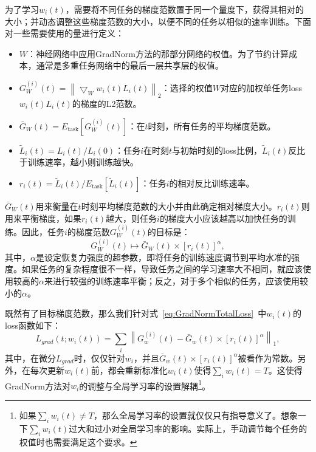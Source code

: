 \documentclass{ctexart}
\begin{document}
为了学习$w_i(t)$，需要将不同任务的梯度范数置于同一个量度下，获得其相对的大小；并动态调整这些梯度范数的大小，以便不同的任务以相似的速率训练。下面对一些需要使用的量进行定义：
\begin{itemize}
    \item $W$：神经网络中应用GradNorm方法的那部分网络的权值。为了节约计算成本，通常是多重任务网络中的最后一层共享层的权值。
    \item $G_{W}^{(i)}(t) =\left \| \bigtriangledown_{W}w_{i}(t)L_{i}(t) \right \|_{2}$：选择的权值$W$对应的加权单任务loss\ $w_{i}(t)L_{i}(t)$的梯度的L2范数。
    \item $\bar{G}_{W}(t)=E_\mathrm{task}[G_{W}^{(i)}(t)]$：在$t$时刻，所有任务的平均梯度范数。
    \item $\tilde{L}_{i}(t)={L_{i}(t)}/{L_{i}(0)}$：任务$i$在时刻$t$与初始时刻的loss比例，$\tilde{L}_{i}(t)$反比于训练速率，越小则训练越快。 %
    \item $r_{i}(t)=\tilde{L}_{i}(t)/E_\mathrm{task}[\tilde{L}_{i}(t)]$：任务$i$的相对反比训练速率。
\end{itemize}

$\bar{G}_{W}(t)$用来衡量在$t$时刻平均梯度范数的大小并由此确定相对梯度大小。$r_{i}(t)$则用来平衡梯度，如果$r_{i}(t)$越大，则任务$i$的梯度大小应该越高以加快任务的训练。因此，任务$i$的梯度范数$G_{W}^{(i)}(t)$的目标是：
\begin{equation}
    G_{W}^{(i)}(t) \mapsto \bar{G}_W(t) \times [r_i(t)]^\alpha, 
\end{equation}
其中，$\alpha$是设定恢复力强度的超参数，即将任务的训练速度调节到平均水准的强度。如果任务的复杂程度很不一样，导致任务之间的学习速率大不相同，就应该使用较高的$\alpha$来进行较强的训练速率平衡；反之，对于多个相似的任务，应该使用较小的$\alpha$。

既然有了目标梯度范数，那么我们针对式~\ref{eq:GradNormTotalLoss}~中$w_i(t)$的loss函数如下：
\begin{equation}
    L_{grad}(t;w_{i}(t))=\sum_{i}\left \| G_{w}^{(i)}(t)-\bar{G}_{w}(t) \times [r_{i}(t)]^{\alpha} \right \|_{1},
\end{equation}
其中，在微分$L_{grad}$时，仅仅针对$w_i$，并且$\bar{G}_{w}(t)\times[r_{i}(t)]^{\alpha}$被看作为常数。另外，在每次更新$w_i(t)$前，都会重新标准化$w_i(t)$使得$\sum_{i}w_{i}(t)=T$。这使得GradNorm方法对$w_i$的调整与全局学习率的设置解耦\footnote{如果$\sum_{i}w_{i}(t)\neq T$，那么全局学习率的设置就仅仅只有指导意义了。想象一下$\sum_{i}w_{i}(t)$过大和过小对全局学习率的影响。实际上，手动调节每个任务的权值时也需要满足这个要求。}。
\end{document}
